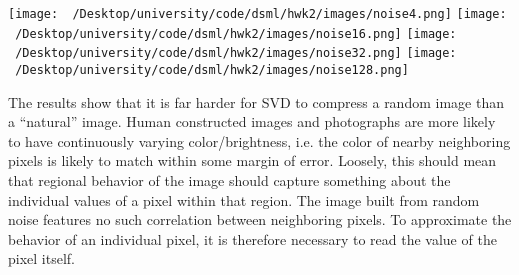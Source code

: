 \begin{homework}[e]
\begin{soln}
\begin{enumerate}[(a)]
\begin{center}
        \texttt{[image: ~/Desktop/university/code/dsml/hwk2/images/noise4.png]}
        \texttt{[image: ~/Desktop/university/code/dsml/hwk2/images/noise16.png]}
        \texttt{[image: ~/Desktop/university/code/dsml/hwk2/images/noise32.png]}
        \texttt{[image: ~/Desktop/university/code/dsml/hwk2/images/noise128.png]}
        \label{fig:prob7c1}
      \end{center}
      The results show that it is far harder for SVD to compress a random image than a ``natural'' image. Human constructed images and photographs are more likely to have continuously varying color/brightness, i.e. the color of nearby neighboring pixels is likely to match within some margin of error. Loosely, this should mean that regional behavior of the image should capture something about the individual values of a pixel within that region. The image built from random noise features no such correlation between neighboring pixels. To approximate the behavior of an individual pixel, it is therefore necessary to read the value of the pixel itself.
    \end{enumerate}
  \end{soln}
\end{homework}

